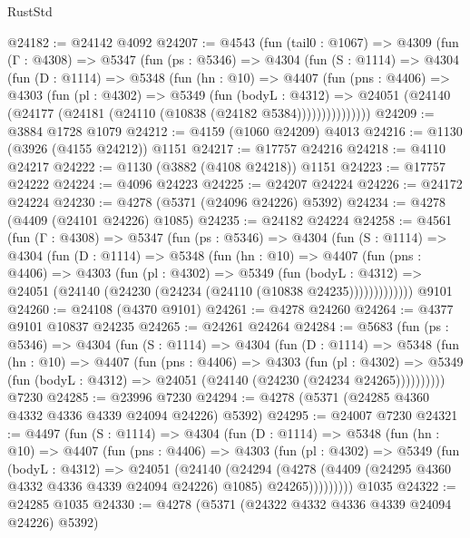 \begin{lexlean}{RustStd}
\begin{coremodule}
{\begin{coremodule}
{{{{{{{{{{{{{{{{{{{{{{{{{{{{{{{{{{{@24182 := @24142 @4092
@24207 := @4543
    (fun (tail0 : @1067) =>
    @4309
      (fun (Γ : @4308) =>
      @5347
        (fun (ps : @5346) =>
        @4304
          (fun (S : @1114) =>
          @4304
            (fun (D : @1114) =>
            @5348
              (fun (hn : @10) =>
              @4407
                (fun (pns : @4406) =>
                @4303
                  (fun (pl : @4302) =>
                  @5349
                    (fun (bodyL : @4312) =>
                    @24051 (@24140 (@24177 (@24181 (@24110 (@10838 (@24182 @5384)))))))))))))))
@24209 := @3884 @1728 @1079
@24212 := @4159 (@1060 @24209) @4013
@24216 := @1130 (@3926 (@4155 @24212)) @1151
@24217 := @17757 @24216
@24218 := @4110 @24217
@24222 := @1130 (@3882 (@4108 @24218)) @1151
@24223 := @17757 @24222
@24224 := @4096 @24223
@24225 := @24207 @24224
@24226 := @24172 @24224
@24230 := @4278 (@5371 (@24096 @24226) @5392)
@24234 := @4278 (@4409 (@24101 @24226) @1085)
@24235 := @24182 @24224
@24258 := @4561
    (fun (Γ : @4308) =>
    @5347
      (fun (ps : @5346) =>
      @4304
        (fun (S : @1114) =>
        @4304
          (fun (D : @1114) =>
          @5348
            (fun (hn : @10) =>
            @4407
              (fun (pns : @4406) =>
              @4303
                (fun (pl : @4302) =>
                @5349
                  (fun (bodyL : @4312) =>
                  @24051 (@24140 (@24230 (@24234 (@24110 (@10838 @24235)))))))))))))
    @9101
@24260 := @24108 (@4370 @9101)
@24261 := @4278 @24260
@24264 := @4377 @9101 @10837 @24235
@24265 := @24261 @24264
@24284 := @5683
    (fun (ps : @5346) =>
    @4304
      (fun (S : @1114) =>
      @4304
        (fun (D : @1114) =>
        @5348
          (fun (hn : @10) =>
          @4407
            (fun (pns : @4406) =>
            @4303
              (fun (pl : @4302) =>
              @5349 (fun (bodyL : @4312) => @24051 (@24140 (@24230 (@24234 @24265))))))))))
    @7230
@24285 := @23996 @7230
@24294 := @4278 (@5371 (@24285 @4360 @4332 @4336 @4339 @24094 @24226) @5392)
@24295 := @24007 @7230
@24321 := @4497
    (fun (S : @1114) =>
    @4304
      (fun (D : @1114) =>
      @5348
        (fun (hn : @10) =>
        @4407
          (fun (pns : @4406) =>
          @4303
            (fun (pl : @4302) =>
            @5349
              (fun (bodyL : @4312) =>
              @24051
                (@24140
                  (@24294
                    (@4278
                      (@4409 (@24295 @4360 @4332 @4336 @4339 @24094 @24226) @1085)
                      @24265)))))))))
    @1035
@24322 := @24285 @1035
@24330 := @4278 (@5371 (@24322 @4332 @4336 @4339 @24094 @24226) @5392)
}}}}}}}}}}}}}}}}}}}}}}}}}}}}}}}}}}}
\end{coremodule}}
\end{coremodule}
\end{lexlean}
